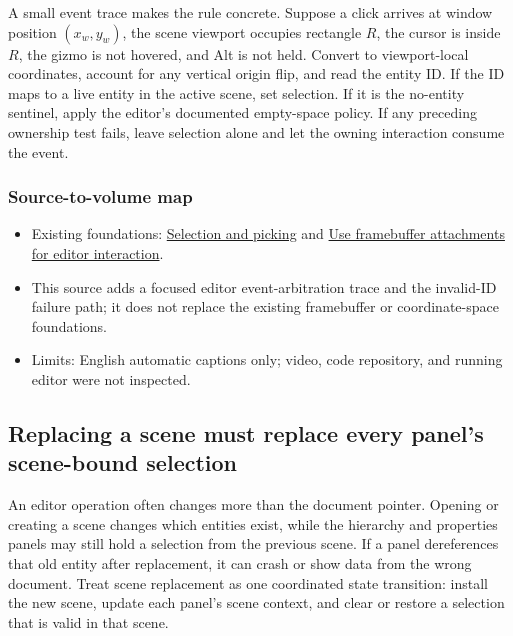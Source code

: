 A small event trace makes the rule concrete. Suppose a click arrives at window position \((x_w,y_w)\), the scene viewport occupies rectangle \(R\), the cursor is inside \(R\), the gizmo is not hovered, and Alt is not held. Convert to viewport-local coordinates, account for any vertical origin flip, and read the entity ID. If the ID maps to a live entity in the active scene, set selection. If it is the no-entity sentinel, apply the editor's documented empty-space policy. If any preceding ownership test fails, leave selection alone and let the owning interaction consume the event.

\subsubsection{Source-to-volume map}\label{06-engine-ii-ch032-source-to-volume-map}

\hypertarget{06-engine-ii-ch032-source-to-volume-map}{}

\begin{itemize}
\tightlist
\item
  Existing foundations: \hyperref[06-engine-ii-ch032-selection-and-picking]{Selection and picking} and \hyperref[06-engine-ii-ch032-use-framebuffer-attachments-for-editor-interaction]{Use framebuffer attachments for editor interaction}.
\item
  This source adds a focused editor event-arbitration trace and the invalid-ID failure path; it does not replace the existing framebuffer or coordinate-space foundations.
\item
  Limits: English automatic captions only; video, code repository, and running editor were not inspected.
\end{itemize}

\subsection{Replacing a scene must replace every panel's scene-bound selection}\label{06-engine-ii-ch032-replacing-a-scene-must-replace-every-panels-scene-bound-selection}

\hypertarget{06-engine-ii-ch032-replacing-a-scene-must-replace-every-panels-scene-bound-selection}{}

An editor operation often changes more than the document pointer. Opening or creating a scene changes which entities exist, while the hierarchy and properties panels may still hold a selection from the previous scene. If a panel dereferences that old entity after replacement, it can crash or show data from the wrong document. Treat scene replacement as one coordinated state transition: install the new scene, update each panel's scene context, and clear or restore a selection that is valid in that scene.

